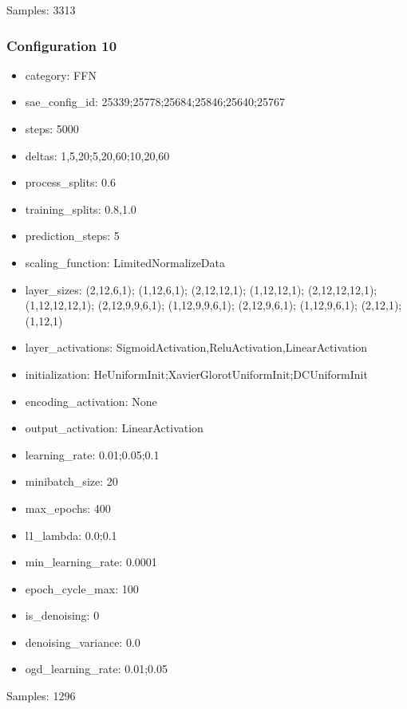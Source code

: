 \documentclass[a4paper,11pt,oneside]{article}
\theoremstyle{plain}
\theoremstyle{definition}
\begin{document}
Samples: 3313

\subsubsection{Configuration 10}\label{config10}
\begin{itemize}
	\item category: FFN
	\item sae\_config\_id: 25339;25778;25684;25846;25640;25767
	\item steps: 5000
	\item deltas: 1,5,20;5,20,60;10,20,60
	\item process\_splits: 0.6
	\item training\_splits: 0.8,1.0
	\item prediction\_steps: 5
	\item scaling\_function: LimitedNormalizeData
	\item layer\_sizes: (2,12,6,1); (1,12,6,1); (2,12,12,1); (1,12,12,1); (2,12,12,12,1); (1,12,12,12,1); (2,12,9,9,6,1); (1,12,9,9,6,1); (2,12,9,6,1); (1,12,9,6,1); (2,12,1); (1,12,1)
	\item layer\_activations: SigmoidActivation,ReluActivation,LinearActivation
	\item initialization: HeUniformInit;XavierGlorotUniformInit;DCUniformInit
	\item encoding\_activation: None
	\item output\_activation: LinearActivation
	\item learning\_rate: 0.01;0.05;0.1
	\item minibatch\_size: 20
	\item max\_epochs: 400
	\item l1\_lambda: 0.0;0.1
	\item min\_learning\_rate: 0.0001
	\item epoch\_cycle\_max: 100
	\item is\_denoising: 0
	\item denoising\_variance: 0.0
	\item ogd\_learning\_rate: 0.01;0.05
\end{itemize}

Samples: 1296
\end{document}
